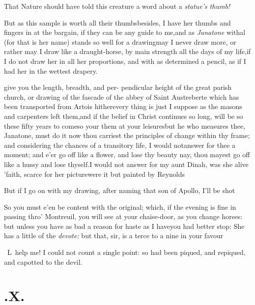 \documentclass{article}
\begin{document}
\tsk That Nature should have told this creature a word
about a \textit{statue’s thumb!}\tsh

\tsk But as this sample is worth all their thumbs\tsh besides, I have her thumbs and
fingers in at the bargain, if they can be any guide to me,\tsk and as
\textit{Janatone} withal (for that is her name) stands so well for a drawing\tsh may
I never draw more, or rather may I draw like a draught-horse, by main strength all
the days of my life,\tsk if I do not draw her in all her proportions, and with as
determined a pencil, as if I had her in the wettest drapery.\tsh

\noindent
{}\break give you the length, breadth, and
per-\break
pendicular height of the great parish church, or drawing of the fascade of the
abbey of Saint Austreberte which has been transported from Artois
hither\tsk every thing is just I suppose as the masons and carpenters left them,\tsk and
if the\break
belief in Christ continues so long, will be\break
so these fifty years to come\tsk so your\break
{}\break
them at your leisures\tsk but he who\break
measures thee, Janatone, must do it now\break
\tsk thou carriest the
principles of change within thy frame; and considering the chances of a transitory
life, I would not\break answer for thee a moment; and e’er
go off like a flower, and lose thy beauty\break
\tsk nay, thou mayest go off like a hussy\break
\tsk and lose thyself.\tsk I would not answer for my aunt Dinah, was she alive\tsh
’faith, scarce for her picture\tsh were it but painted by Reynolds\tsk

\tsk But if I go on with my drawing, after naming that son of
Apollo, I’ll be shot\tsh

So you must e’en be content with the original; which, if the evening is fine in
passing thro’ Montreuil, you will see at your chaise-door, as you change horses: but
unless you have as bad a reason for haste as I have\tsk you had better stop:\tsk{}
\tsk She has a little of the \textit{devote:} but\break
that, sir, is a terce to a nine in your\break
favour \tsh

\tsk\ L\tsk\ help me! I could not count a single point: so
had been piqued, and repiqued, and capotted to the devil.

\section{.\enspace X.}
\end{document}
